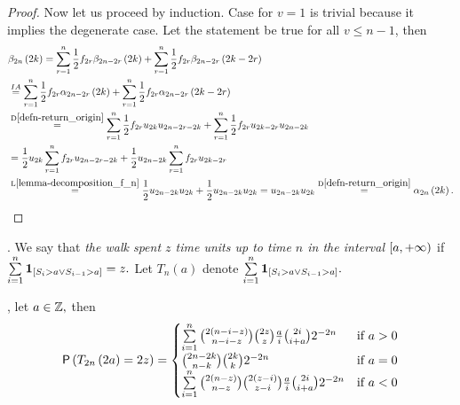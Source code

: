 \begin{proof}
 Now let us proceed by induction. Case for $v=1$ is trivial because it implies the degenerate case. Let the statement be true for all $v \leq n-1$, then
 \[
  \begin{split}
    &\beta_{2n}\left(2k\right)=\suma[r][1][n] \h f_{2r} \beta_{2n-2r}\left(2k\right)+\suma[r][1][n] \h f_{2r}\beta_{2n-2r}\left(2k-2r\right)\\
    & \induk \suma[r][1][n] \h f_{2r} \alpha_{2n-2r}\left(2k\right)+\suma[r][1][n] \h f_{2r}\alpha_{2n-2r}\left(2k-2r\right)\\
    & \overset{\text{D}\ref{defn-return_origin}}{=} \suma[r][1][n] \h f_{2r} u_{2k}u_{2n-2r-2k}+\suma[r][1][n] \h f_{2r} u_{2k-2r}u_{2n-2k}\\
    & = \h u_{2k} \suma[r][1][n] f_{2r} u_{2n-2r-2k}+ \h u_{2n-2k} \suma[r][1][n] f_{2r} u_{2k-2r}\\
    & \overset{\text{L}\ref{lemma-decomposition_f_n}}{=} \h u_{2n-2k} u_{2k} +\h u_{2n-2k} u_{2k}=u_{2n-2k} u_{2k}
   \overset{\text{D}\ref{defn-return_origin}}{=}\alpha_{2n}\left(2k\right).
  \end{split}
 \]
\end{proof}
\begin{comment}
\begin{defn}[Change of a sign]
 \Lrw. We say that \intime $n$ occurred a change of sign if if $S_{n-1}\cdot S_{n+1}=-1$ in other words if $\left(S_{n-1}=+1 \land S_{n+1}=-1\right) \lor \left(S_{n-1}=-1 \land S_{n+1}=+1\right).$
 We shall denote the probability that up to \Time $n$ occurred $r$ changes of sign by $\xi_{r, n}$.
\end{defn}
\begin{thm}[Change of a sign]
 \Lrws. The probability $\xi_{r,2n+1}=2\pr\left( S_{2n+1}=2r+1 \right)$
\end{thm}
\begin{proof}
 Feller
\end{proof}
\end{comment}
\begin{defn}\label{defn-time_spent_above}
  \Lrw. We say that \emph{the walk spent $z$ time units up to time $n$ in the interval $\left[a,{+\infty} \right)$} if $\suma \indikator{S_i>a \lor S_{i-1}>a}=z.$
  Let $T_n\left(a\right)$ denote $\suma \indikator{S_i>a \lor S_{i-1}>a}.$
\end{defn}
\begin{thm}[Probability of spending $2z$ time units in intrerval $[2a,\pinf)$]
  \Lrws, let $a\in \mathbb{Z},$ then
  \[
  \pr \left(T_{2n} \left( 2a \right)=2z \right)=
  \begin{cases}
    \suma \binom{2\left(n-i-z\right)}{n-i-z}\binom{2z}{z}\frac{a}{i}\binom{2i}{i+a}2^{-2n} & \text{if $a>0$}\\
    \binom{2n-2k}{n-k}\binom{2k}{k}2^{-2n} & \text{if $a=0$}\\
    \suma \binom{2\left(n-z\right)}{n-z}\binom{2\left(z-i\right)}{z-i}\frac{a}{i}\binom{2i}{i+a}2^{-2n} & \text{if  $a<0$}\\
  \end{cases}
  \]
\end{thm}

